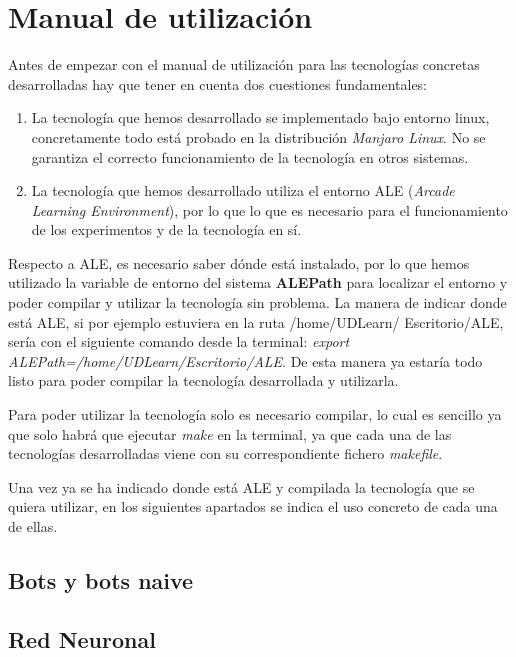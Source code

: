\section{Manual de utilización}
\label{sec:usageManual}

Antes de empezar con el manual de utilización para las tecnologías concretas desarrolladas hay que tener en cuenta dos cuestiones fundamentales:

\begin{enumerate}
    \item La tecnología que hemos desarrollado se implementado bajo entorno linux, concretamente todo está probado en la distribución \textit{Manjaro Linux}. No se garantiza el correcto funcionamiento de la tecnología en otros sistemas.
    \item La tecnología que hemos desarrollado utiliza el entorno ALE (\textit{Arcade Learning Environment}), por lo que lo que es necesario para el funcionamiento de los experimentos y de la tecnología en sí.
\end{enumerate}

Respecto a ALE, es necesario saber dónde está instalado, por lo que hemos utilizado la variable de entorno del sistema \textbf{ALEPath} para localizar el entorno y poder compilar y utilizar la tecnología sin problema. La manera de indicar donde está ALE, si por ejemplo estuviera en la ruta /home/UDLearn/ Escritorio/ALE, sería con el siguiente comando desde la terminal: \textit{export ALEPath=/home/UDLearn/Escritorio/ALE}. De esta manera ya estaría todo listo para poder compilar la tecnología desarrollada y utilizarla.

Para poder utilizar la tecnología solo es necesario compilar, lo cual es sencillo ya que solo habrá que ejecutar \textit{make} en la terminal, ya que cada una de las tecnologías desarrolladas viene con su correspondiente fichero \textit{makefile}.

Una vez ya se ha indicado donde está ALE y compilada la tecnología que se quiera utilizar, en los siguientes apartados se indica el uso concreto de cada una de ellas.

\newpage
\subsection{Bots y bots naive}


\newpage
\subsection{Red Neuronal}


